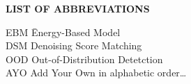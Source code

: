 {}

\begin{center}
{\normalfont \textbf{LIST OF ABBREVIATIONS}}
\end{center}

\newcommand{\Ab}[2]{\noindent  #1 \> #2 \\}
\newcommand{\Abi}[2]{\noindent #1 \hspace{1.5cm} \= #2 \\}

\begin{tabbing}
\Abi{EBM}{Energy-Based Model}
\Ab{DSM}{Denoising Score Matching}
\Ab{OOD}{Out-of-Distribution Detetction}
\Ab{AYO}{Add Your Own in alphabetic order\ldots}
\end{tabbing}

\clearpage
